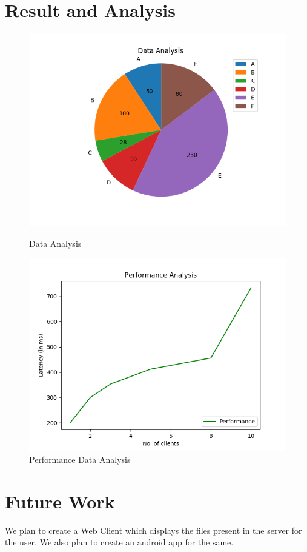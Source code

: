 \documentclass{article}
\begin{document}
    \section{Result and Analysis}
    \begin{figure}[H]
        \includegraphics[width=\linewidth]{Data.png}
        \caption{Data Analysis}
        \includegraphics[width=\linewidth]{Performance.png}
        \caption{Performance Data Analysis}
    \end{figure}
    \newpage
    \section{Future Work}
    We plan to create a Web Client which displays the files present in the server for the user. We also plan to create an android app for the same.
    
\end{document}
